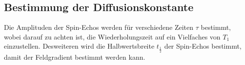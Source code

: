 \subsection{Bestimmung der Diffusionskonstante}
Die Amplituden der Spin-Echos werden für verschiedene Zeiten $\tau$ bestimmt, wobei
darauf zu achten ist, die Wiederholungszeit auf ein Vielfaches von $T_1$ einzustellen.
Desweiteren wird die Halbwertsbreite $t_{\frac{1}{2}}$ der Spin-Echos bestimmt, damit der
Feldgradient bestimmt werden kann.
